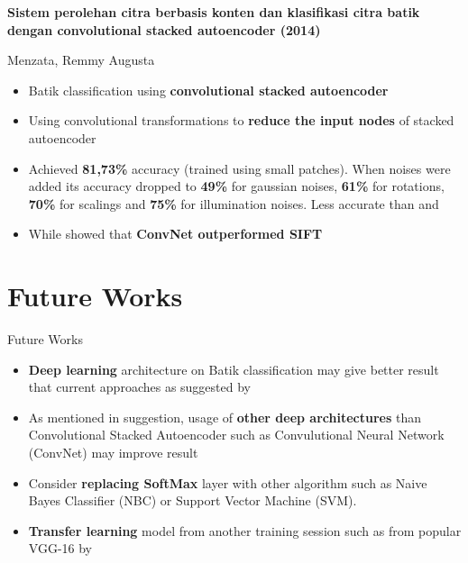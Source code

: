 \documentclass[10pt]{beamer}
\begin{document}
\begin{frame}{\cite{menzata2014sistem}}

	\textbf{Sistem perolehan citra berbasis konten dan klasifikasi citra batik dengan convolutional stacked autoencoder (2014)}
	
	{\small Menzata, Remmy Augusta}
	
	\begin{itemize}[<+->]
		
		\item Batik classification using \textbf{convolutional stacked autoencoder}
		
		\item Using convolutional transformations to \textbf{reduce the input nodes} of stacked autoencoder
		
		\item Achieved \textbf{81,73\%} accuracy (trained using small patches). When noises were added its accuracy dropped to \textbf{49\%} for gaussian noises, \textbf{61\%} for rotations, \textbf{70\%} for scalings and \textbf{75\%} for illumination noises. Less accurate than \cite{azhar2015batik} and \cite{nurhaida2015automatic}
		
		\item While \cite{fischer2014descriptor} showed that \textbf{ConvNet outperformed SIFT} 
		
	\end{itemize}
	
\end{frame}

\section{Future Works}

\begin{frame}{Future Works}
	
	\begin{itemize}[<+->]
	
		\item \textbf{Deep learning} architecture on Batik classification may give better result that current approaches as suggested by \cite{fischer2014descriptor}
		
		\item As mentioned in \cite{menzata2014sistem} suggestion, usage of \textbf{other deep architectures} than Convolutional Stacked Autoencoder such as Convulutional Neural Network (ConvNet) may improve result
		
		\item Consider \textbf{replacing SoftMax} layer with other algorithm such as Naive Bayes Classifier (NBC) or Support Vector Machine (SVM).
		
		\item \textbf{Transfer learning} model from another training session such as from popular VGG-16 by \cite{simonyan2014very}
	
	\end{itemize}
	
\end{frame}
\end{document}
